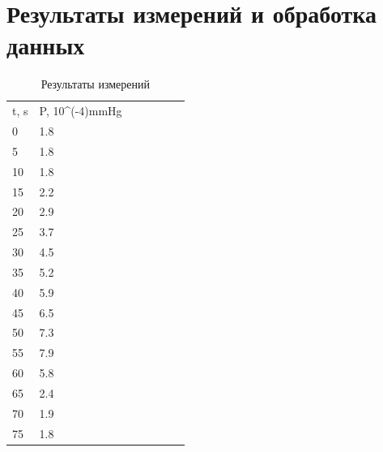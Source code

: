 \documentclass[a4paper,12pt]{article} %
\begin{document}
\section{Результаты измерений и обработка данных}

\begin{table}[H]
	\caption{Результаты измерений}
	\label{table:main}
\begin{tabular}{lllllll}
t, s & P, 10\textasciicircum{}(-4)mmHg &  &  &  &  &  \\
0    & 1.8                              &  &  &  &  &  \\
5    & 1.8                              &  &  &  &  &  \\
10   & 1.8                              &  &  &  &  &  \\
15   & 2.2                              &  &  &  &  &  \\
20   & 2.9                              &  &  &  &  &  \\
25   & 3.7                              &  &  &  &  &  \\
30   & 4.5                              &  &  &  &  &  \\
35   & 5.2                              &  &  &  &  &  \\
40   & 5.9                              &  &  &  &  &  \\
45   & 6.5                              &  &  &  &  &  \\
50   & 7.3                              &  &  &  &  &  \\
55   & 7.9                              &  &  &  &  &  \\
60   & 5.8                              &  &  &  &  &  \\
65   & 2.4                              &  &  &  &  &  \\
70   & 1.9                              &  &  &  &  &  \\
75   & 1.8                              &  &  &  &  & 
\end{tabular}
\end{table}
\end{document}

